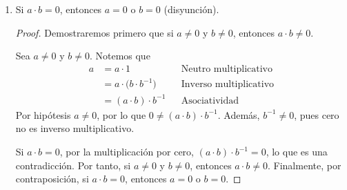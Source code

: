 \documentclass[11pt]{article}
\begin{document}
\begin{enumerate}[label=\alph*)]
 \item Si $ a \cdot b = 0 $, entonces $a=0$ o $b=0$ (disyunción).
 \begin{proof} Demostraremos primero que si $a\neq 0$ y $b\neq 0$, entonces $a\cdot b\neq 0$.
 
 Sea $a\neq 0$ y $b\neq 0$. Notemos que \begin{align*}
  a &= a\cdot 1 && \text{Neutro multiplicativo}\\
  &= a\cdot \bigl(b\cdot b^{-1}\bigr) && \text{Inverso multiplicativo}\\
  &= (a\cdot b) \cdot b^{-1} && \text{Asociatividad}
 \end{align*}
 Por hipótesis $a\neq 0$, por lo que $0\neq (a\cdot b) \cdot b^{-1}$. Además, $b^{-1}\neq 0$, pues cero no es inverso multiplicativo.
 
 Si $a\cdot b=0$, por la multiplicación por cero, $(a\cdot b) \cdot b^{-1}=0$, lo que es una contradicción. Por tanto, si $a\neq 0$ y $b\neq 0$, entonces $a\cdot b\neq 0$. Finalmente, por contraposición, si $a\cdot b =0$, entonces $a=0$ o $b=0$.
 \end{proof}


\end{enumerate}
\end{document}
